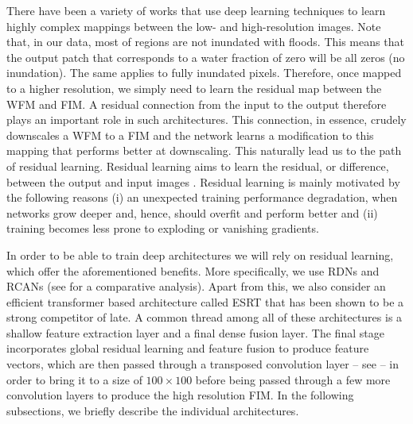 
There have been a variety of works that use deep learning techniques to learn highly complex mappings between the low- and high-resolution images. Note that, in our data, most of regions are not inundated with floods. This means that the output patch that corresponds to a water fraction of zero will be all zeros (no inundation). The same applies to fully inundated pixels. Therefore, once mapped to a higher resolution, we simply need to learn the residual map between the \ac{WFM} and \ac{FIM}. A residual connection from the input to the output therefore plays an important role in such architectures. This connection, in essence, crudely downscales a \ac{WFM} to a \ac{FIM} and the network learns a modification to this mapping that performs better at downscaling. This naturally lead us to the path of residual learning. Residual learning aims to learn the residual, or difference, between the output and input images \cite{He2016DeepRecognition}.  Residual learning is mainly motivated by the following reasons (i) an unexpected training performance degradation, when networks grow deeper and, hence, should overfit and perform better and (ii) training becomes less prone to exploding or vanishing gradients. 


In order to be able to train deep architectures we will rely on residual learning, which offer the aforementioned benefits. More specifically, we use \acp{RDN} \cite{Zhang2018ResidualDenseSuperResolution} and \acp{RCAN} \cite{Zhang2018RCANSuperResolution} (see \cite{Wang2021DeepSurvey} for a comparative analysis).
Apart from this, we also consider an efficient transformer based architecture called \ac{ESRT} \cite{LuESRT2022} that has been shown to be a strong competitor of late. A common thread among all of these architectures is a shallow feature extraction layer and a final dense fusion layer. The final stage incorporates global residual learning and feature fusion to produce feature vectors, which are then passed through a transposed convolution layer  -- see  \cite{Shi2016SubPixelConvolution} -- in order to bring it to a size of $100 \times 100$ before being passed through a few more convolution layers to produce the high resolution \ac{FIM}. In the following subsections, we briefly describe the individual architectures. 


